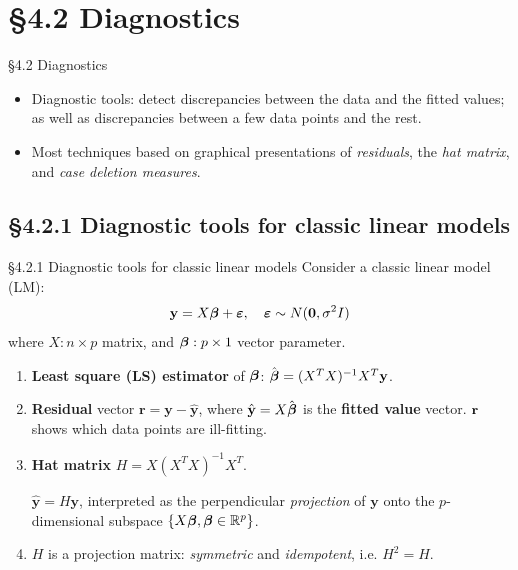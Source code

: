 \documentclass{beamer}
\newcommand{\currentsection}{}
\let\oldsection\section
\renewcommand{\section}[1]{\oldsection{#1}\renewcommand{\currentsection}{#1}}
\newcommand{\currentsubsection}{}
\let\oldsubsection\subsection
\renewcommand{\subsection}[1]{\oldsubsection{#1}\renewcommand{\currentsubsection}{#1}}
\begin{document}
\section{\S4.2 Diagnostics}
\begin{frame}{\S4.2 Diagnostics}
\begin{itemize}
\item
Diagnostic tools: detect discrepancies between the data and the fitted values;
as well as discrepancies between a few data points and the rest.
\item
Most techniques  based on graphical presentations of \textit{residuals}, the \textit{hat matrix}, and 
\textit{case deletion measures}.
\end{itemize}
\end{frame}

\subsection{\S4.2.1 Diagnostic tools for classic linear models}
\begin{frame}{\S4.2.1 Diagnostic tools for classic linear models}
Consider a classic linear model (LM): 
$$\textbf{y}=X\mbox{\boldmath $\beta$}+\mbox{\boldmath $\varepsilon$}, \quad
\mbox{\boldmath $\varepsilon$}\sim N(\textbf{0},\sigma^2I)$$
where $X: n\times p$ matrix, and $\mbox{\boldmath $\beta$}: p\times 1$ vector parameter.
\begin{enumerate}
\item
\textbf{Least square (LS) estimator} of $\mbox{\boldmath $\beta$}$:  
$\hat{\mbox{\boldmath $\beta$}}=(X^TX)^{-1}X^T\textbf{y}$.
\item
\textbf{Residual} vector $\textbf{r}=\textbf{y}-\hat{\textbf{y}}$, where $\hat{\textbf{y}}=X\hat{\mbox{\boldmath $\beta$}}$
is the \textbf{fitted value} vector. $\bf r$ shows which data points are ill-fitting.
\item
\textbf{Hat matrix} $H=X(X^TX)^{-1}X^T$. \vspace{8pt}

$\hat{\textbf{y}}=H\textbf{y}$, interpreted as the perpendicular \textit{projection} of $\textbf{y}$ onto the $p$-dimensional subspace
$\{X\mbox{\boldmath $\beta$}, \mbox{\boldmath $\beta$}\in\mathbb{R}^p\}$. \vspace{8pt}

\item $H$ is a projection matrix: \textit{symmetric} and \textit{idempotent}, i.e. $H^2=H$.
\end{enumerate}
\end{frame}
\end{document}
